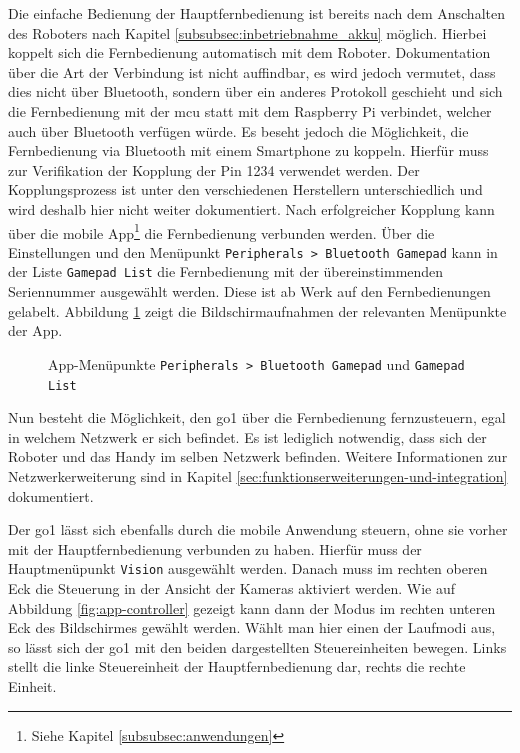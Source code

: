 Die einfache Bedienung der Hauptfernbedienung ist bereits nach dem Anschalten des Roboters nach Kapitel \ref{subsubsec:inbetriebnahme_akku} möglich.
Hierbei koppelt sich die Fernbedienung automatisch mit dem Roboter.
Dokumentation über die Art der Verbindung ist nicht auffindbar, es wird jedoch vermutet, dass dies nicht über Bluetooth,
sondern über ein anderes Protokoll geschieht und sich die Fernbedienung mit der \gls{mcu} statt mit dem Raspberry
Pi verbindet, welcher auch über Bluetooth verfügen würde.
Es beseht jedoch die Möglichkeit, die Fernbedienung via Bluetooth mit einem Smartphone zu koppeln.
Hierfür muss zur Verifikation der Kopplung der Pin \num{1234} verwendet werden.
Der Kopplungsprozess ist unter den verschiedenen Herstellern unterschiedlich und wird deshalb hier nicht weiter dokumentiert.
Nach erfolgreicher Kopplung kann über die mobile App\footnote{Siehe Kapitel \ref{subsubsec:anwendungen}} die Fernbedienung verbunden werden.
Über die Einstellungen und den Menüpunkt \texttt{Peripherals > Bluetooth Gamepad} kann in der Liste \texttt{Gamepad List}
die Fernbedienung mit der übereinstimmenden Seriennummer ausgewählt werden.
Diese ist ab Werk auf den Fernbedienungen gelabelt.
Abbildung \ref{fig:controller-app} zeigt die Bildschirmaufnahmen der relevanten Menüpunkte der App.

\begin{figure}[h]
    \caption{App-Menüpunkte \texttt{Peripherals > Bluetooth Gamepad} und \texttt{Gamepad List}}\label{fig:controller-app}
\end{figure}

\noindent Nun besteht die Möglichkeit, den \gls{go1} über die Fernbedienung fernzusteuern, egal in welchem Netzwerk er sich befindet.
Es ist lediglich notwendig, dass sich der Roboter und das Handy im selben Netzwerk befinden.
Weitere Informationen zur Netzwerkerweiterung sind in Kapitel \ref{sec:funktionserweiterungen-und-integration} dokumentiert.


Der \gls{go1} lässt sich ebenfalls durch die mobile Anwendung steuern, ohne sie vorher mit der Hauptfernbedienung verbunden zu haben.
Hierfür muss der Hauptmenüpunkt \texttt{Vision} ausgewählt werden.
Danach muss im rechten oberen Eck die Steuerung in der Ansicht der Kameras aktiviert werden.
Wie auf Abbildung \ref{fig:app-controller} gezeigt kann dann der Modus im rechten unteren Eck des Bildschirmes gewählt werden.
Wählt man hier einen der Laufmodi aus, so lässt sich der \gls{go1} mit den beiden dargestellten Steuereinheiten bewegen.
Links stellt die linke Steuereinheit der Hauptfernbedienung dar, rechts die rechte Einheit.

